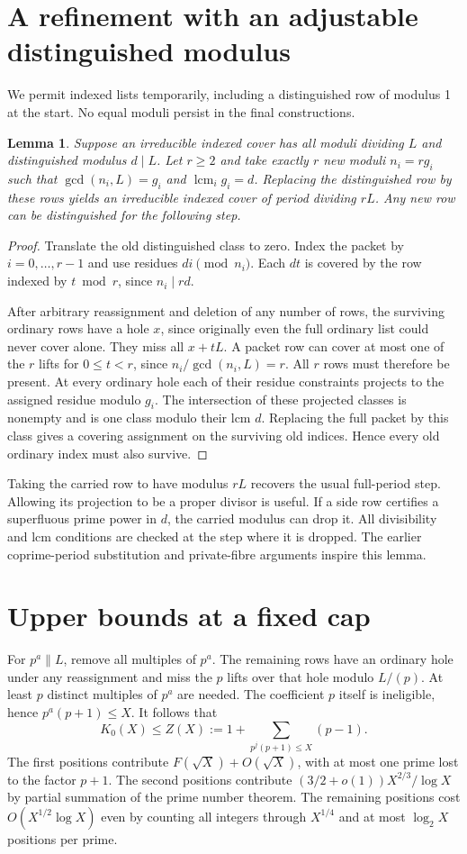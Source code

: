 \documentclass[11pt]{article}
\newtheorem{lemma}[theorem]{Lemma}
\newcommand{\lcm}{\operatorname{lcm}}
\begin{document}
\section{A refinement with an adjustable distinguished modulus}
We permit indexed lists temporarily, including a distinguished row of modulus 1 at the start. No equal moduli persist in the final constructions.
\begin{lemma}\label{lift}
Suppose an irreducible indexed cover has all moduli dividing $L$ and distinguished modulus $d\mid L$. Let $r\ge2$ and take exactly $r$ new moduli $n_i=r g_i$ such that $\gcd(n_i,L)=g_i$ and $\lcm_i g_i=d$. Replacing the distinguished row by these rows yields an irreducible indexed cover of period dividing $rL$. Any new row can be distinguished for the following step.
\end{lemma}
\begin{proof}
Translate the old distinguished class to zero. Index the packet by $i=0,\ldots,r-1$ and use residues $di\pmod {n_i}$. Each $dt$ is covered by the row indexed by $t\bmod r$, since $n_i\mid rd$.

After arbitrary reassignment and deletion of any number of rows, the surviving ordinary rows have a hole $x$, since originally even the full ordinary list could never cover alone. They miss all $x+tL$. A packet row can cover at most one of the $r$ lifts for $0\le t<r$, since $n_i/\gcd(n_i,L)=r$. All $r$ rows must therefore be present. At every ordinary hole each of their residue constraints projects to the assigned residue modulo $g_i$. The intersection of these projected classes is nonempty and is one class modulo their lcm $d$. Replacing the full packet by this class gives a covering assignment on the surviving old indices. Hence every old ordinary index must also survive.
\end{proof}
Taking the carried row to have modulus $rL$ recovers the usual full-period step. Allowing its projection to be a proper divisor is useful. If a side row certifies a superfluous prime power in $d$, the carried modulus can drop it. All divisibility and lcm conditions are checked at the step where it is dropped. The earlier coprime-period substitution and private-fibre arguments inspire this lemma.

\section{Upper bounds at a fixed cap}
For $p^a\parallel L$, remove all multiples of $p^a$. The remaining rows have an ordinary hole under any reassignment and miss the $p$ lifts over that hole modulo $L/(p)$. At least $p$ distinct multiples of $p^a$ are needed. The coefficient $p$ itself is ineligible, hence $p^a(p+1)\le X$. It follows that
\[
 K_0(X)\le Z(X):=1+\sum_{p^j(p+1)\le X}(p-1).
\]
The first positions contribute $F(\sqrt X)+O(\sqrt X)$, with at most one prime lost to the factor $p+1$. The second positions contribute $(3/2+o(1))X^{2/3}/\log X$ by partial summation of the prime number theorem. The remaining positions cost $O(X^{1/2}\log X)$ even by counting all integers through $X^{1/4}$ and at most $\log_2 X$ positions per prime.
\end{document}
